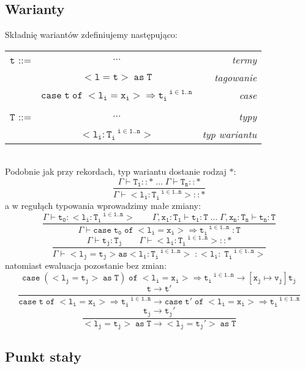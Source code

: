 \documentclass[11pt,leqno]{article}
\begin{document}
\subsection{Warianty}

Składnię wariantów zdefiniujemy następująco:\\

\begin{tabular}{| l c r |}
  \hline
  $\mathtt{t}$ ::= & $\dots$ & \textit{termy}  \\
   & $\mathtt{<l=t>\;as\;T}$ & \textit{tagowanie} \\
   & $\mathtt{case\;t\;of\;<l_i=x_i>\Rightarrow t_i^{\;\;\;i \in 1..n}}$ & \textit{case}\\
   & & \\
  $\mathtt{T}$ ::= & $\dots$ & \textit{typy}  \\
   & $\mathtt{<l_i:T_i^{\;\;\;i \in 1..n}>}$ & \textit{typ wariantu}\\
  \hline
\end{tabular} \\

Podobnie jak przy rekordach, typ wariantu dostanie rodzaj $\mathtt{\ast}$:
 	\[\mathtt{
             \frac{\Gamma \vdash T_1::\ast \;\dots\;\Gamma \vdash T_n::\ast}{\Gamma \vdash <l_i:T_i^{\;\;\;i \in 1..n}>::\ast}
		}
	\]
a w regułąch typowania wprowadzimy małe zmiany:
 	\[\mathtt{ \frac{\Gamma \vdash t_0:<l_i:T_i^{\;\;\;i \in 1..n}> \hspace{2em} \Gamma,x_1:T_1 \vdash t_1:T \;\dots\; \Gamma,x_n:T_n \vdash t_n:T}{\Gamma \vdash case\;t_0\;of\;<l_i=x_i>\Rightarrow t_i^{\;\;\;i \in 1..n}\; : T}
		}
	\]
 	\[\mathtt{ \frac{\Gamma \vdash t_j : T_j \hspace{2em} \Gamma \vdash <l_i:T_i^{\;\;\;i \in 1..n}>::\ast}{\Gamma \vdash <l_j=t_j> as <l_i:T_i^{\;\;\;i \in 1..n}> \;: <l_i:\;T_i^{\;\;\;i \in 1..n}>}
		}
	\]
natomiast ewaluacja pozostanie bez zmian:
 	\[\mathtt{ case\;(<l_j=t_j>\;as\;T)\;of\;<l_i=x_i>\Rightarrow t_i^{\;\;\;i \in 1..n} \longrightarrow [x_j \mapsto v_j]t_j
		}
	\]
 	\[\mathtt{ \frac{t \longrightarrow t'}{case\;t\;of\;<l_i=x_i>\Rightarrow t_i^{\;\;\;i \in 1..n} \longrightarrow case\;t'\;of\;<l_i=x_i>\Rightarrow t_i^{\;\;\;i \in 1..n} }
		}
	\]
 	\[\mathtt{ \frac{t_j \longrightarrow t_j'}{<l_j=t_j>\;as\;T \longrightarrow <l_j=t_j'>\;as\;T }
		}
	\]

\subsection{Punkt stały}
\end{document}
